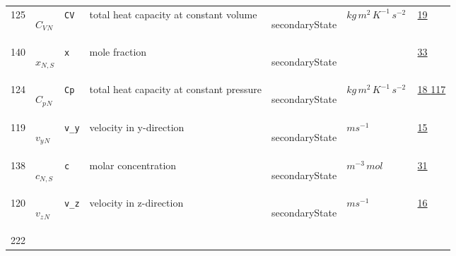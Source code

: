 \begin{longtable}{|p{1cm}|p{2.5cm}|p{4.5cm}|p{8cm}|p{3.0cm}|p{3cm}|p{1cm}|}
            125
             & \hypertarget{"v:125"}{ $ {{C_V}}{_{N}} $}
             & \verb|CV|
             & total heat capacity at constant volume
             & \begin{lay}secondaryState \end{lay}
             & $ kg \,m^{2} \,K^{-1} \,s^{-2} \, $
             &                 \hyperlink{"e:19"}{ 19 }
                 \\
            140
             & \hypertarget{"v:140"}{ $ {x}{_{N, S}} $}
             & \verb|x|
             & mole fraction
             & \begin{lay}secondaryState \end{lay}
             & $  $
             &                 \hyperlink{"e:33"}{ 33 }
                 \\
            124
             & \hypertarget{"v:124"}{ $ {{C_p}}{_{N}} $}
             & \verb|Cp|
             & total heat capacity at constant pressure
             & \begin{lay}secondaryState \end{lay}
             & $ kg \,m^{2} \,K^{-1} \,s^{-2} \, $
             &                 \hyperlink{"e:18"}{ 18 }
                                 \hyperlink{"e:117"}{ 117 }
                 \\
            119
             & \hypertarget{"v:119"}{ $ {{v_y}}{_{N}} $}
             & \verb|v_y|
             & velocity in y-direction
             & \begin{lay}secondaryState \end{lay}
             & $ m s^{-1} \, $
             &                 \hyperlink{"e:15"}{ 15 }
                 \\
            138
             & \hypertarget{"v:138"}{ $ {c}{_{N, S}} $}
             & \verb|c|
             & molar concentration
             & \begin{lay}secondaryState \end{lay}
             & $ m^{-3} \,mol \, $
             &                 \hyperlink{"e:31"}{ 31 }
                 \\
            120
             & \hypertarget{"v:120"}{ $ {{v_z}}{_{N}} $}
             & \verb|v_z|
             & velocity in z-direction
             & \begin{lay}secondaryState \end{lay}
             & $ m s^{-1} \, $
             &                 \hyperlink{"e:16"}{ 16 }
                 \\
            222

\end{longtable}

